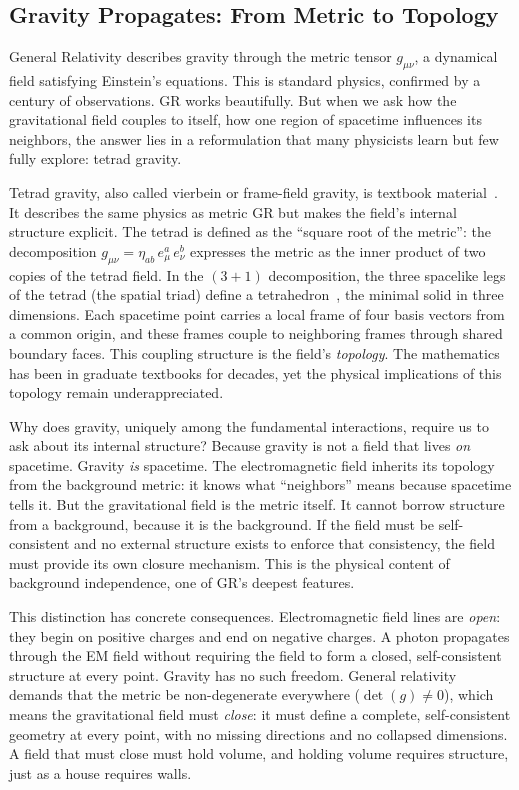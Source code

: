 \documentclass[aps,prd,preprint,superscriptaddress,showpacs,preprintnumbers,amsmath,amssymb,nofootinbib]{revtex4-2}
\begin{document}
\subsection{Gravity Propagates: From Metric to Topology}
\label{subsec:propagates}

General Relativity describes gravity through the metric tensor $g_{\mu\nu}$, a dynamical field satisfying Einstein's equations. This is standard physics, confirmed by a century of observations. GR works beautifully. But when we ask how the gravitational field couples to itself, how one region of spacetime influences its neighbors, the answer lies in a reformulation that many physicists learn but few fully explore: tetrad gravity.

Tetrad gravity, also called vierbein or frame-field gravity, is textbook material~\cite{mtw1973,wald1984}. It describes the same physics as metric GR but makes the field's internal structure explicit. The tetrad is defined as the ``square root of the metric'': the decomposition $g_{\mu\nu} = \eta_{ab}\,e^a_\mu\,e^b_\nu$ expresses the metric as the inner product of two copies of the tetrad field. In the $(3{+}1)$ decomposition, the three spacelike legs of the tetrad (the spatial triad) define a tetrahedron~\cite{barbieri1998}, the minimal solid in three dimensions. Each spacetime point carries a local frame of four basis vectors from a common origin, and these frames couple to neighboring frames through shared boundary faces. This coupling structure is the field's \emph{topology}. The mathematics has been in graduate textbooks for decades, yet the physical implications of this topology remain underappreciated.

Why does gravity, uniquely among the fundamental interactions, require us to ask about its internal structure? Because gravity is not a field that lives \emph{on} spacetime. Gravity \emph{is} spacetime. The electromagnetic field inherits its topology from the background metric: it knows what ``neighbors'' means because spacetime tells it. But the gravitational field is the metric itself. It cannot borrow structure from a background, because it is the background. If the field must be self-consistent and no external structure exists to enforce that consistency, the field must provide its own closure mechanism. This is the physical content of background independence, one of GR's deepest features.

This distinction has concrete consequences. Electromagnetic field lines are \emph{open}: they begin on positive charges and end on negative charges. A photon propagates through the EM field without requiring the field to form a closed, self-consistent structure at every point. Gravity has no such freedom. General relativity demands that the metric be non-degenerate everywhere ($\det(g) \neq 0$), which means the gravitational field must \emph{close}: it must define a complete, self-consistent geometry at every point, with no missing directions and no collapsed dimensions. A field that must close must hold volume, and holding volume requires structure, just as a house requires walls.
\end{document}
